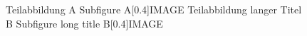 \documentclass{article}
\begin{document}
\begin{figure}[!htb]
  \centering
  \bisubcaptionbox
    {Teilabbildung A\label{fig:test:A}}
    {Subfigure A}[0.4\textwidth]{IMAGE}%
  \qquad
  \bisubcaptionbox
    {Teilabbildung langer Titel B\label{fig:test:B}}
    {Subfigure long title B}[0.4\textwidth]{IMAGE}%
  \label{fig:test}
\end{figure}
\end{document}
